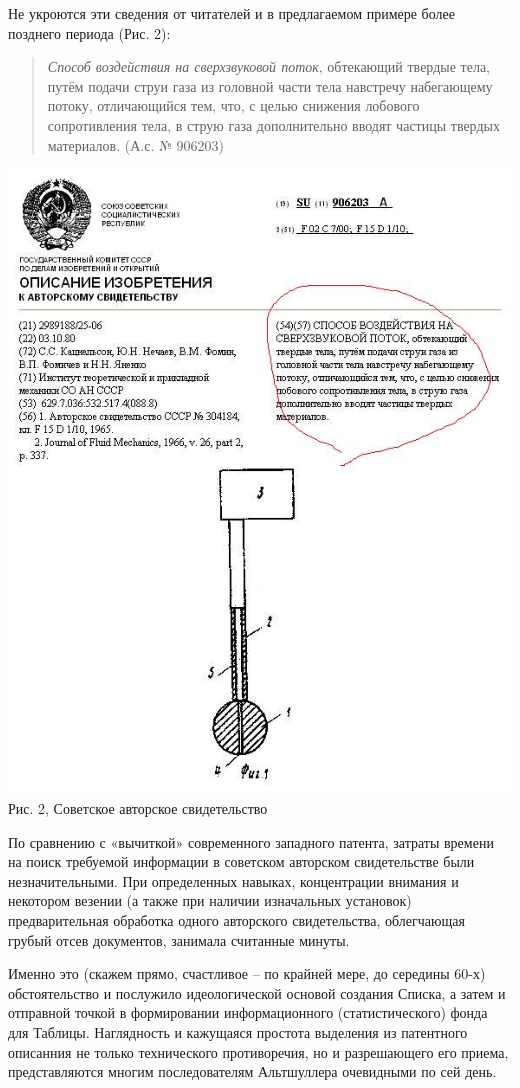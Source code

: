 \documentclass[11pt,a4paper]{article}
\begin{document}
Не укроются эти сведения от читателей и в предлагаемом примере более позднего
периода (Рис. 2):
\begin{quote}
  \emph{Способ воздействия на сверхзвуковой поток}, обтекающий твердые тела, путём
  подачи струи газа из головной части тела навстречу набегающему потоку,
  отличающийся тем, что, с целью снижения лобового сопротивления тела, в струю
  газа дополнительно вводят частицы твердых материалов. (А.с. № 906203)
\end{quote}
\begin{center}
  \includegraphics[width=.8\textwidth]{./12.jpg} \\
  Рис. 2, Советское авторское свидетельство
\end{center}

По сравнению с «вычиткой» современного западного патента, затраты времени на
поиск требуемой информации в советском авторском свидетельстве были
незначительными. При определенных навыках, концентрации внимания и некотором
везении (а также при наличии изначальных установок) предварительная обработка
одного авторского свидетельства, облегчающая грубый отсев документов, занимала
считанные минуты.

Именно это (скажем прямо, счастливое -- по крайней мере, до середины 60-х)
обстоятельство и послужило идеологической основой создания Списка, а затем и
отправной точкой в формировании информационного (статистического) фонда для
Таблицы. Наглядность и кажущаяся простота выделения из патентного описанния не
только технического противоречия, но и разрешающего его приема, представляются
многим последователям Альтшуллера очевидными по сей день.
\end{document}
